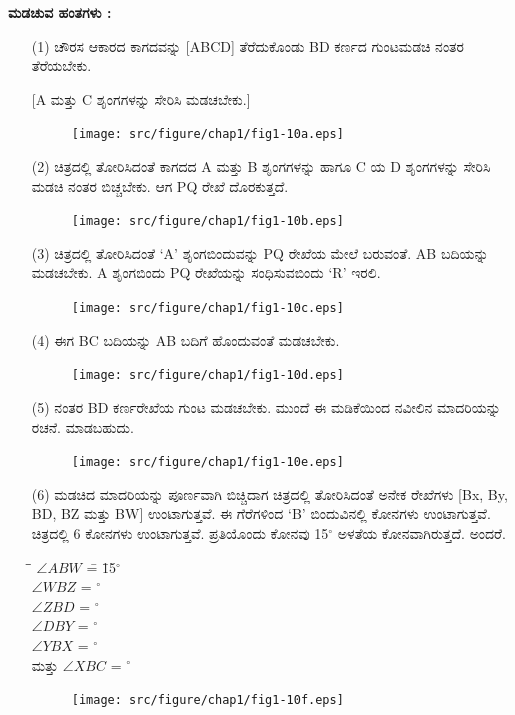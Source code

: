 \noindent
\textbf{ಮಡಚುವ ಹಂತಗಳು :}
\begin{itemize}
\item[(1)] ಚೌರಸ ಆಕಾರದ ಕಾಗದವನ್ನು [ABCD] ತೆರೆದುಕೊಂಡು BD ಕರ್ಣದ ಗುಂಟ\break ಮಡಚಿ ನಂತರ ತೆರೆಯಬೇಕು. 

[A ಮತ್ತು C ಶೃಂಗಗಳನ್ನು ಸೇರಿಸಿ ಮಡಚಬೇಕು.]
\begin{figure}[H]
\centering
\texttt{[image: src/figure/chap1/fig1-10a.eps]}
\end{figure}

\item[(2)] ಚಿತ್ರದಲ್ಲಿ ತೋರಿಸಿದಂತೆ ಕಾಗದದ A ಮತ್ತು  B ಶೃಂಗಗಳನ್ನು ಹಾಗೂ  C ಯ D ಶೃಂಗಗಳನ್ನು ಸೇರಿಸಿ ಮಡಚಿ ನಂತರ ಬಿಚ್ಚಬೇಕು. ಆಗ PQ ರೇಖೆ ದೊರಕುತ್ತದೆ. 
\begin{figure}[H]
\centering
\texttt{[image: src/figure/chap1/fig1-10b.eps]}
\end{figure}

\item[(3)] ಚಿತ್ರದಲ್ಲಿ ತೋರಿಸಿದಂತೆ  `A' ಶೃಂಗಬಿಂದುವನ್ನು PQ ರೇಖೆಯ ಮೇಲೆ ಬರುವಂತೆ.  AB ಬದಿಯನ್ನು ಮಡಚಬೇಕು.  A ಶೃಂಗಬಿಂದು  PQ ರೇಖೆಯನ್ನು ಸಂಧಿಸುವ\break ಬಿಂದು   `R' ಇರಲಿ. 
\begin{figure}[H]
\centering
\texttt{[image: src/figure/chap1/fig1-10c.eps]}
\end{figure}

\item[(4)] ಈಗ BC ಬದಿಯನ್ನು AB ಬದಿಗೆ ಹೊಂದುವಂತೆ ಮಡಚಬೇಕು. 
\begin{figure}[H]
\centering
\texttt{[image: src/figure/chap1/fig1-10d.eps]}
\end{figure}

\item[(5)] ನಂತರ BD ಕರ್ಣರೇಖೆಯ ಗುಂಟ ಮಡಚಬೇಕು. ಮುಂದೆ ಈ ಮಡಿಕೆಯಿಂದ ನವೀಲಿನ ಮಾದರಿಯನ್ನು ರಚನೆ. ಮಾಡಬಹುದು. 
\begin{figure}[H]
\centering
\texttt{[image: src/figure/chap1/fig1-10e.eps]}
\end{figure}

\item[(6)] ಮಡಚಿದ ಮಾದರಿಯನ್ನು ಪೂರ್ಣವಾಗಿ ಬಿಚ್ಚಿದಾಗ ಚಿತ್ರದಲ್ಲಿ ತೋರಿಸಿದಂತೆ ಅನೇಕ ರೇಖೆಗಳು [Bx, By, BD, BZ ಮತ್ತು  BW] ಉಂಟಾಗುತ್ತವೆ. ಈ ಗೆರೆಗಳಿಂದ `B' ಬಿಂದುವಿನಲ್ಲಿ ಕೋನಗಳು ಉಂಟಾಗುತ್ತವೆ. ಚಿತ್ರದಲ್ಲಿ 6 ಕೋನಗಳು ಉಂಟಾಗು\-ತ್ತವೆ. ಪ್ರತಿಯೊಂದು ಕೋನವು  15$^\circ$ ಅಳತೆಯ ಕೋನವಾಗಿರುತ್ತದೆ. ಅಂದರೆ. 
\begin{tabbing}
\= \quad \quad \= $\angle  ABW$ \= = \= 15$^\circ$\\
\> \> $\angle WBZ$ \> = $^\circ$\\
\> \> $\angle  ZBD$ \> = $^\circ$\\
\> \> $\angle  DBY$ \> = $^\circ$\\
\> \> $\angle  YBX$ \> = $^\circ$ \\
ಮತ್ತು \> \> $\angle  XBC$ \> = $^\circ$
\end{tabbing}
\begin{figure}[H]
\centering
\texttt{[image: src/figure/chap1/fig1-10f.eps]}
\end{figure}
\end{itemize}

